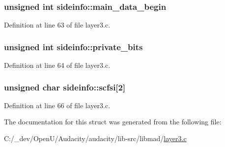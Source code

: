 \subsubsection[{\texorpdfstring{main\+\_\+data\+\_\+begin}{main_data_begin}}]{\setlength{\rightskip}{0pt plus 5cm}unsigned {\bf int} sideinfo\+::main\+\_\+data\+\_\+begin}\hypertarget{structsideinfo_a31f43e855dfe735cd84e59e0ee8fe632}{}\label{structsideinfo_a31f43e855dfe735cd84e59e0ee8fe632}


Definition at line 63 of file layer3.\+c.

\subsubsection[{\texorpdfstring{private\+\_\+bits}{private_bits}}]{\setlength{\rightskip}{0pt plus 5cm}unsigned {\bf int} sideinfo\+::private\+\_\+bits}\hypertarget{structsideinfo_ab47893e416cacb23bbde687fca85063f}{}\label{structsideinfo_ab47893e416cacb23bbde687fca85063f}


Definition at line 64 of file layer3.\+c.

\subsubsection[{\texorpdfstring{scfsi}{scfsi}}]{\setlength{\rightskip}{0pt plus 5cm}unsigned char sideinfo\+::scfsi\mbox{[}2\mbox{]}}\hypertarget{structsideinfo_ad8ddfae45f59d7852bb2fea6f79072a0}{}\label{structsideinfo_ad8ddfae45f59d7852bb2fea6f79072a0}


Definition at line 66 of file layer3.\+c.



The documentation for this struct was generated from the following file\+:\begin{DoxyCompactItemize}
\item 
C\+:/\+\_\+dev/\+Open\+U/\+Audacity/audacity/lib-\/src/libmad/\hyperlink{layer3_8c}{layer3.\+c}\end{DoxyCompactItemize}
